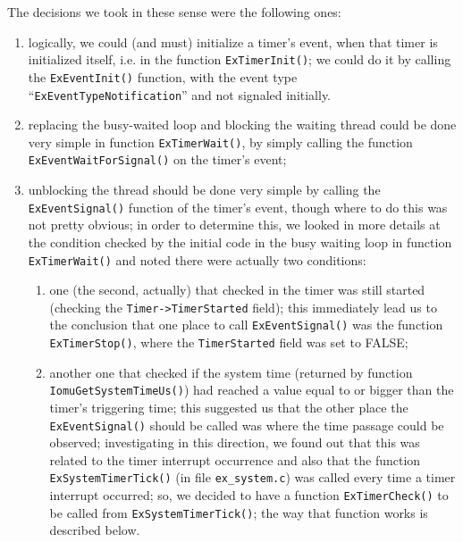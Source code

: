 The decisions we took in these sense were the following ones:
\begin{enumerate}
    \item logically, we could (and must) initialize a timer's event, when that timer is initialized itself, i.e. in the function \lstinline|ExTimerInit()|; we could do it by calling the \lstinline|ExEventInit()| function, with the event type ``\lstinline|ExEventTypeNotification|'' and not signaled initially.
    
    \item replacing the busy-waited loop and blocking the waiting thread could be done very simple in function \lstinline|ExTimerWait()|, by simply calling the function \lstinline|ExEventWaitForSignal()| on the timer's event;
    
    \item unblocking the thread should be done very simple by calling the \lstinline|ExEventSignal()| function of the timer's event, though where to do this was not pretty obvious; in order to determine this, we looked in more details at the condition checked by the initial code in the busy waiting loop in function \lstinline|ExTimerWait()| and noted there were actually two conditions:
        \begin{enumerate}
            \item one (the second, actually) that checked in the timer was still started (checking the \lstinline|Timer->TimerStarted| field); this immediately lead us to the conclusion that one place to call \lstinline|ExEventSignal()| was the function \lstinline|ExTimerStop()|, where the \lstinline|TimerStarted| field was set to FALSE; 
            
            \item another one that checked if the system time (returned by function \lstinline|IomuGetSystemTimeUs()|) had reached a value equal to or bigger than the timer's triggering time; this suggested us that the other place the \lstinline|ExEventSignal()| should be called was where the time passage could be observed; investigating in this direction, we found out that this was related to the timer interrupt occurrence and also that the function \lstinline|ExSystemTimerTick()| (in file \lstinline|ex_system.c|) was called every time a timer interrupt occurred; so, we decided to have a function \lstinline|ExTimerCheck()| to be called from \lstinline|ExSystemTimerTick()|; the way that function works is described below.
        \end{enumerate}

\end{enumerate}

